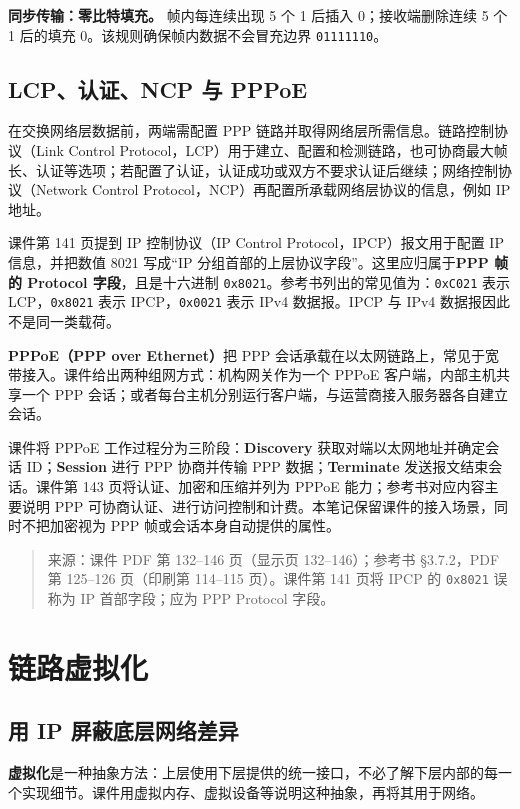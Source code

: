 \textbf{同步传输：零比特填充。} 帧内每连续出现 5 个 1 后插入 0；接收端删除连续 5 个 1 后的填充 0。该规则确保帧内数据不会冒充边界 \texttt{01111110}。


\subsection{LCP、认证、NCP 与 PPPoE}
在交换网络层数据前，两端需配置 PPP 链路并取得网络层所需信息。链路控制协议（Link Control Protocol，LCP）用于建立、配置和检测链路，也可协商最大帧长、认证等选项；若配置了认证，认证成功或双方不要求认证后继续；网络控制协议（Network Control Protocol，NCP）再配置所承载网络层协议的信息，例如 IP 地址。

课件第 141 页提到 IP 控制协议（IP Control Protocol，IPCP）报文用于配置 IP 信息，并把数值 8021 写成“IP 分组首部的上层协议字段”。这里应归属于\textbf{PPP 帧的 Protocol 字段}，且是十六进制 \texttt{0x8021}。参考书列出的常见值为：\texttt{0xC021} 表示 LCP，\texttt{0x8021} 表示 IPCP，\texttt{0x0021} 表示 IPv4 数据报。IPCP 与 IPv4 数据报因此不是同一类载荷。

\textbf{PPPoE（PPP over Ethernet）}把 PPP 会话承载在以太网链路上，常见于宽带接入。课件给出两种组网方式：机构网关作为一个 PPPoE 客户端，内部主机共享一个 PPP 会话；或者每台主机分别运行客户端，与运营商接入服务器各自建立会话。

课件将 PPPoE 工作过程分为三阶段：\textbf{Discovery} 获取对端以太网地址并确定会话 ID；\textbf{Session} 进行 PPP 协商并传输 PPP 数据；\textbf{Terminate} 发送报文结束会话。课件第 143 页将认证、加密和压缩并列为 PPPoE 能力；参考书对应内容主要说明 PPP 可协商认证、进行访问控制和计费。本笔记保留课件的接入场景，同时不把加密视为 PPP 帧或会话本身自动提供的属性。


\begin{quote}\small 来源：课件 PDF 第 132--146 页（显示页 132--146）；参考书 §3.7.2，PDF 第 125--126 页（印刷第 114--115 页）。课件第 141 页将 IPCP 的 \texttt{0x8021} 误称为 IP 首部字段；应为 PPP Protocol 字段。\end{quote}

\section{链路虚拟化}

\subsection{用 IP 屏蔽底层网络差异}
\textbf{虚拟化}是一种抽象方法：上层使用下层提供的统一接口，不必了解下层内部的每一个实现细节。课件用虚拟内存、虚拟设备等说明这种抽象，再将其用于网络。

